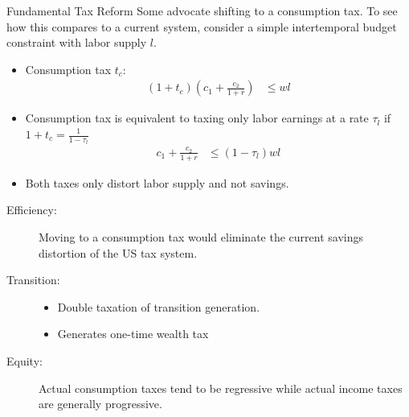 \documentclass[10pt]{extarticle}
\begin{document}
  \begin{problem}{Fundamental Tax Reform}
    Some advocate shifting to a consumption tax. To see how this compares to a current system, consider a simple intertemporal budget constraint with labor supply $l$.
    \begin{itemize}
      \item Consumption tax $t_c$:
        \begin{align*}
          (1+t_c)\left(c_1 + \frac{c_2}{1+r}\right) &\leq wl
        \end{align*}
      \item Consumption tax is equivalent to taxing only labor earnings at a rate $\tau_l$ if $1 + t_c = \frac{1}{1-\tau_l}$
        \begin{align*}
          c_1 + \frac{c_2}{1+r} &\leq (1-\tau_l)wl
        \end{align*}
      \item Both taxes only distort labor supply and not savings.
    \end{itemize}
    \begin{description}
      \item[Efficiency:] Moving to a consumption tax would eliminate the current savings distortion of the US tax system.
      \item[Transition:]\hfill
        \begin{itemize}
          \item Double taxation of transition generation.
          \item Generates one-time wealth tax
        \end{itemize}
      \item[Equity:] Actual consumption taxes tend to be regressive while actual income taxes are generally progressive.
    \end{description}
  \end{problem}
\end{document}
